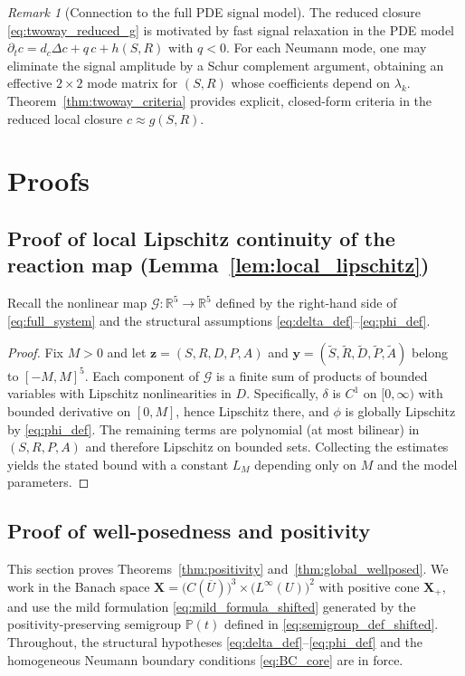 \documentclass[pdflatex,sn-mathphys-ay]{sn-jnl}
\theoremstyle{thmstyleone}
\theoremstyle{definition}
\theoremstyle{remark}
\newtheorem{remark}[theorem]{Remark}
\begin{document}
\begin{remark}[Connection to the full PDE signal model]
\label{rem:twoway_pde_connection}
The reduced closure \eqref{eq:twoway_reduced_g} is motivated by fast signal relaxation in the PDE model
$\partial_t c=d_c\Delta c+q\,c+h(S,R)$ with $q<0$.
For each Neumann mode, one may eliminate the signal amplitude by a Schur complement argument, obtaining an effective
$2\times2$ mode matrix for $(S,R)$ whose coefficients depend on $\lambda_k$.
Theorem~\ref{thm:twoway_criteria} provides explicit, closed-form criteria in the reduced local closure $c\approx g(S,R)$.
\end{remark}

\section{Proofs}
\label{sec:analysis}

\subsection{Proof of local Lipschitz continuity of the reaction map (Lemma~\ref{lem:local_lipschitz})}
\label{subsec:analysis_Lipschitz}

Recall the nonlinear map $\mathcal{G}: \mathbb{R}^5\to\mathbb{R}^5$ defined by the right-hand side of \eqref{eq:full_system} and
the structural assumptions \eqref{eq:delta_def}--\eqref{eq:phi_def}.

\begin{proof}
Fix $M>0$ and let $\mathbf{z}=(S,R,D,P,A)$ and $\mathbf{y}=(\tilde S,\tilde R,\tilde D,\tilde P,\tilde A)$ belong to $[-M,M]^5$.
Each component of $\mathcal{G}$ is a finite sum of products of bounded variables with Lipschitz nonlinearities in $D$.
Specifically, $\delta$ is $C^1$ on $[0,\infty)$ with bounded derivative on $[0,M]$, hence Lipschitz there, and $\phi$ is globally Lipschitz by
\eqref{eq:phi_def}. The remaining terms are polynomial (at most bilinear) in $(S,R,P,A)$ and therefore Lipschitz on bounded sets.
Collecting the estimates yields the stated bound with a constant $L_M$ depending only on $M$ and the model parameters.
\end{proof}

\subsection{Proof of well-posedness and positivity}
\label{subsec:analysis_wellposed}

This section proves Theorems~\ref{thm:positivity} and~\ref{thm:global_wellposed}.
We work in the Banach space $\mathbf{X}= \bigl(C(\overline U)\bigr)^3 \times \bigl(L^\infty(U)\bigr)^2$ with positive cone $\mathbf{X}_+$, and use the mild formulation
\eqref{eq:mild_formula_shifted} generated by the positivity-preserving semigroup $\mathbb{P}(t)$ defined in \eqref{eq:semigroup_def_shifted}.
Throughout, the structural hypotheses \eqref{eq:delta_def}--\eqref{eq:phi_def} and the homogeneous Neumann boundary conditions
\eqref{eq:BC_core} are in force.
\end{document}
